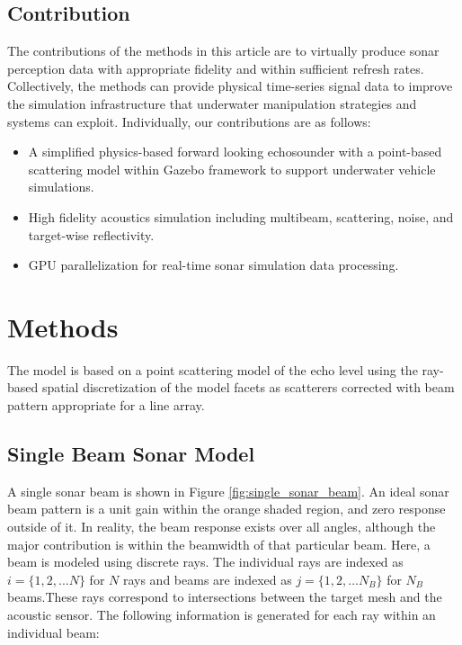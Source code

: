 \documentclass[utf8]{frontiersSCNS} %
\begin{document}
\subsection{Contribution}
The contributions of the methods in this article are to virtually produce sonar perception data with appropriate fidelity and within sufficient refresh rates. Collectively, the methods can provide physical time-series signal data to improve the simulation infrastructure that underwater manipulation strategies and systems can exploit. Individually, our contributions are as follows: 
\begin{itemize}
\item A simplified physics-based forward looking echosounder with a point-based scattering model within Gazebo framework to support underwater vehicle simulations.
\item High fidelity acoustics simulation including multibeam, scattering, noise, and target-wise reflectivity.
\item GPU parallelization for real-time sonar simulation data processing.
\end{itemize}


\section{Methods}

The model is based on a point scattering model of the echo level using the ray-based spatial discretization of the model facets as scatterers corrected with beam pattern appropriate for a line array.

\subsection{Single Beam Sonar Model}
A single sonar beam is shown in Figure \ref{fig:single_sonar_beam}. An ideal sonar beam pattern is a unit gain within the orange shaded region, and zero response outside of it. In reality, the beam response exists over all angles, although the major contribution is within the beamwidth of that particular beam. Here, a beam is modeled using discrete rays. The individual rays are indexed as $i=\{1, 2, ... N\}$ for $N$ rays and beams are indexed as $j=\{1, 2, ... N_B\}$ for $N_B$ beams.These rays correspond to intersections between the target mesh and the acoustic sensor. The following information is generated for each ray within an individual beam:
\end{document}
